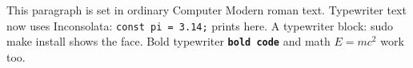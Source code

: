 \documentclass{article}
\begin{document}
This paragraph is set in ordinary Computer Modern roman text.
Typewriter text now uses Inconsolata: \texttt{const pi = 3.14;} prints here.
A typewriter block: {\ttfamily sudo make install} shows the face.
Bold typewriter \texttt{\textbf{bold code}} and math $E = mc^2$ work too.
\end{document}
